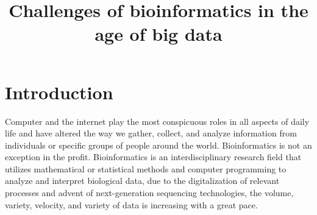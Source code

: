 \documentclass[12pt]{article}
\begin{document}
\title{\large Challenges of bioinformatics in the age of big data\vspace{-2em}}
\date{\vspace{-2.5em}}
\maketitle

\section{Introduction}
Computer and the internet play the most conspicuous roles in all aspects of daily life and have altered the way we gather, collect, and analyze information from individuals or specific groups of people around the world. Bioinformatics is not an exception in the profit. Bioinformatics is an interdisciplinary research field that utilizes mathematical or statistical methods and computer programming to analyze and interpret biological data, due to the digitalization of relevant processes and advent of next-generation sequencing technologies, the volume, variety, velocity, and variety of data is increasing with a great pace.\medskip
\end{document}
